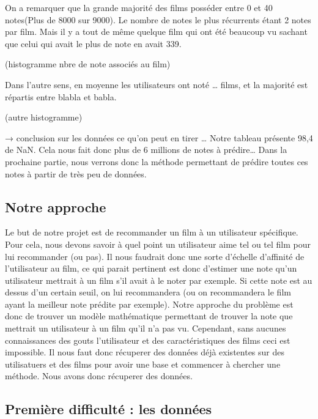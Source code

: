 \documentclass[a4paper,10pt]{article}
\begin{document}
On a remarquer que la grande majorité des films posséder entre 0 et 40 notes(Plus de 8000 sur 9000). 
Le nombre de notes le plus récurrents étant 2 notes par film. Mais il y a tout de même quelque film qui ont été
beaucoup vu sachant que celui qui avait le plus de note en avait 339.

(histogramme nbre de note associés au film)

Dans l’autre sens, en moyenne les utilisateurs ont noté … films, et la majorité est répartis entre blabla et babla.

(autre histogramme)

→ conclusion sur les données ce qu’on peut en tirer …
Notre tableau présente 98,4 \pourcent de NaN. Cela nous fait donc plus de 6 millions de notes à prédire… Dans la prochaine partie,
nous verrons donc la méthode permettant de prédire toutes ces notes à partir de très peu de données.

\subsection{Notre approche}
Le but de notre projet est de recommander un film à un utilisateur spécifique. 
Pour cela, nous devons savoir à quel point un utilisateur aime tel ou tel film pour lui recommander (ou pas). 
Il nous faudrait donc une sorte d'échelle d'affinité de l'utilisateur au film, ce qui parait pertinent est donc d'estimer une note qu'un utilisateur mettrait à un film s'il avait à le noter par exemple. 
Si cette note est au dessus d'un certain seuil, on lui recommandera (ou on recommandera le film ayant la meilleur note prédite par exemple). 
Notre approche du problème est donc de trouver un modèle mathématique permettant de trouver la note que mettrait un utilisateur à un film qu'il n'a pas vu. 
Cependant, sans aucunes connaissances des gouts l'utilisateur et des caractéristiques des films ceci est impossible. Il nous faut donc récuperer des données déjà existentes sur des utilisatuers et des films pour avoir une base et commencer à chercher une méthode.  
Nous avons donc récuperer des données.

\subsection{Première difficulté : les données}
\end{document}
